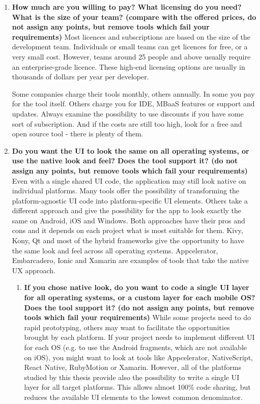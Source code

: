 \documentclass[english,master,public,dept460,male,cpdeclaration,oneside]{diploma}
\begin{document}
\begin{enumerate}
	\item \textbf{How much are you willing to pay? What licensing do you need? What is the size of your team? (compare with the offered prices, do not assign any points, but remove tools which fail your requirements) }
	Most licences and subscriptions are based on the size of the development team. Individuals or small teams can get licences for free, or a very small cost. However, teams around 25 people and above usually require an enterprise-grade licence. These high-end licensing options are usually in thousands of dollars per year per developer. 
	
	Some companies charge their tools monthly, others annually. In some you pay for the tool itself. Others charge you for IDE, MBaaS features or support and updates. Always examine the possibility to use discounts if you have some sort of subscription. And if the costs are still too high, look for a free and open source tool - there is plenty of them.
	
	\item \textbf{Do you want the UI to look the same on all operating systems, or use the native look and feel? Does the tool support it? (do not assign any points, but remove tools which fail your requirements) }
	Even with a single shared UI code, the application may still look native on individual platforms. Many tools offer the possibility of transforming the platform-agnostic UI code into platform-specific UI elements. Others take a different approach and give the possibility for the app to look exactly the same on Android, iOS and Windows. Both approaches have their pros and cons and it depends on each project what is most suitable for them. Kivy, Kony, Qt and most of the hybrid frameworks give the opportunity to have the same look and feel across all operating systems. Appcelerator, Embarcadero, Ionic and Xamarin are examples of tools that take the native UX approach.
	
	\begin{enumerate}
		\item \textbf{If you chose native look, do you want to code a single UI layer for all operating systems, or a custom layer for each mobile OS? Does the tool support it? (do not assign any points, but remove tools which fail your requirements) }
		While some projects need to do rapid prototyping, others may want to facilitate the opportunities brought by each platform. If your project needs to implement different UI for each OS (e.g. to use the Android fragments, which are not available on iOS), you might want to look at tools like Appcelerator, NativeScript, React Native, RubyMotion or Xamarin. However, all of the platforms studied by this thesis provide also the possibility to write a single UI layer for all target platforms. This allows almost 100\% code sharing, but reduces the available UI elements to the lowest common denominator.
	\end{enumerate}
	

\end{enumerate}
\end{document}
